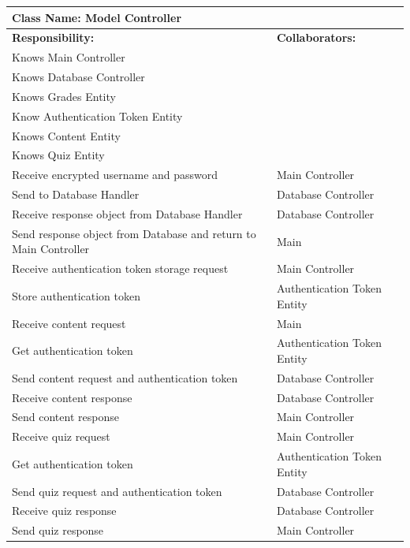 \documentclass[]{article}
\begin{document}
\begin{enumerate}[a)]

	\begin{table}[ht]
	\centering
		\begin{tabular}{|p{5cm}|p{5cm}|}
		\hline
		 \multicolumn{2}{|l|}{\textbf{Class Name: Model Controller}} \\
		\hline
		\textbf{Responsibility:} & \textbf{Collaborators:} \\
		\hline
		Knows Main Controller & \\
		\hline
		Knows Database Controller & \\
		\hline
		Knows Grades Entity & \\
		\hline
		Know Authentication Token Entity & \\
		\hline
		Knows Content Entity & \\
		\hline
		Knows Quiz Entity & \\
		\hline
		Receive encrypted username and password & Main Controller \\
		\hline
		Send to Database Handler & Database Controller \\
		\hline
		Receive response object from Database Handler & Database Controller \\
		\hline
		Send response object from Database and return to Main Controller & Main \\
		\hline
		Receive authentication token storage request & Main Controller \\
		\hline
		Store authentication token & Authentication Token Entity \\
		\hline
		Receive content request & Main \\
		\hline
		Get authentication token & Authentication Token Entity \\
		\hline
		Send content request and authentication token & Database Controller \\
		\hline
		Receive content response & Database Controller \\
		\hline
		Send content response & Main Controller \\
		\hline
		Receive quiz request & Main Controller \\
		\hline
		Get authentication token & Authentication Token Entity \\
		\hline
		Send quiz request and authentication token & Database Controller\\
		\hline
		Receive quiz response & Database Controller \\
		\hline
		Send quiz response & Main Controller \\

\end{tabular}
\end{table}
\end{enumerate}
\end{document}
